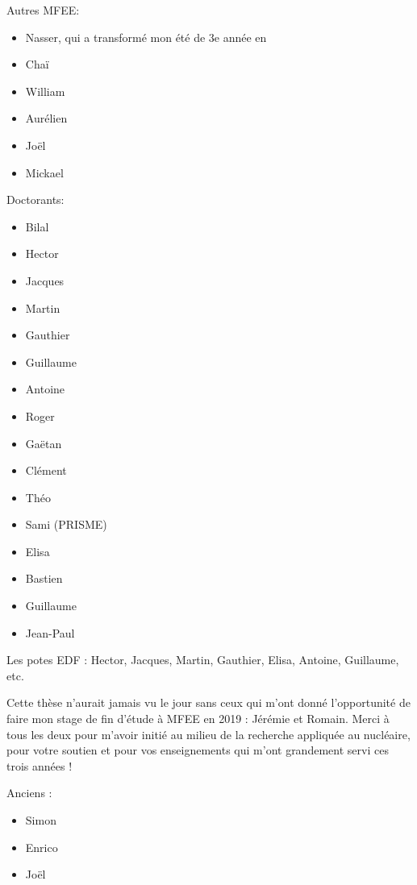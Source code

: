 Autres MFEE:

\begin{itemize}
\item Nasser, qui a transformé mon été de 3e année en 
\item Chaï
\item William
\item Aurélien
\item Joël
\item Mickael
\end{itemize}

Doctorants:

\begin{itemize}
\item Bilal
\item Hector
\item Jacques
\item Martin
\item Gauthier
\item Guillaume
\item Antoine
\item Roger
\item Gaëtan
\item Clément
\item Théo
\item Sami (PRISME)
\item Elisa
\item Bastien
\item Guillaume
\item Jean-Paul
\end{itemize}



Les potes EDF : Hector, Jacques, Martin, Gauthier, Elisa, Antoine, Guillaume, etc.





Cette thèse n'aurait jamais vu le jour sans ceux qui m'ont donné l'opportunité de faire mon stage de fin d'étude à MFEE en 2019 : Jérémie et Romain. Merci à tous les deux pour m'avoir initié au milieu de la recherche appliquée au nucléaire, pour votre soutien et pour vos enseignements qui m'ont grandement servi ces trois années !

\npar

Anciens :

\begin{itemize}
\item Simon
\item Enrico
\item Joël
\end{itemize}


